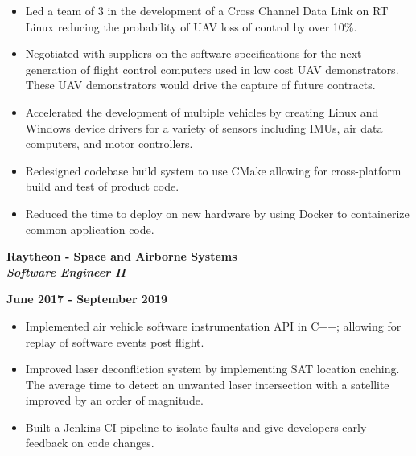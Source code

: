 \documentclass[12pt,letterpaper]{article}
\begin{document}
\begin{itemize}[noitemsep,topsep=0pt]
    \setlength\itemsep{0.2em}
    \item Led a team of 3 in the development of a Cross Channel Data
          Link on RT Linux reducing the probability of UAV loss of control by
          over 10\%.
    \item Negotiated with suppliers on the software specifications for the next
          generation of flight control computers used in low cost UAV
          demonstrators. These UAV demonstrators would drive the capture of
          future contracts.
    \item Accelerated the development of multiple vehicles by creating Linux
          and Windows device drivers for a variety of sensors including IMUs,
          air data computers, and motor controllers.
    \item Redesigned codebase build system to use CMake allowing for
          cross-platform build and test of product code.
    \item Reduced the time to deploy on new hardware by using Docker to
          containerize common application code.
\end{itemize}

\medskip

\begin{minipage}[t]{0.53\textwidth}
    \begin{flushleft}
        \textbf{Raytheon - Space and Airborne Systems}\\
        \textbf{\textit{Software Engineer II}}\\
    \end{flushleft}
\end{minipage}
\begin{minipage}[t]{0.43\textwidth}
    \begin{flushright}
        \textbf{June 2017 - September 2019}
    \end{flushright}
\end{minipage}

\begin{itemize}[noitemsep,topsep=0pt]
    \setlength\itemsep{0.2em}
    \item Implemented air vehicle software instrumentation API in C++; allowing
          for replay of software events post flight.
    \item Improved laser deconfliction system by implementing SAT location
          caching. The average time to detect an unwanted laser intersection
          with a satellite improved by an order of magnitude.
    \item Built a Jenkins CI pipeline to isolate faults and give developers
          early feedback on code changes.
\end{itemize}
\end{document}
